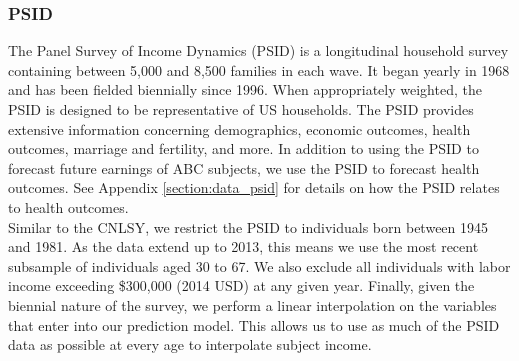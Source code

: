 \subsubsection{PSID}
\label{app:subject_income_psid}

\noindent The Panel Survey of Income Dynamics (PSID) is a longitudinal household survey containing between 5,000
and 8,500 families in each wave. It began yearly in 1968 and has been fielded biennially since 1996.
When appropriately weighted, the PSID is designed to be representative of US households. The PSID
provides extensive information concerning demographics, economic outcomes, health outcomes, marriage
and fertility, and more. In addition to using the PSID to forecast future earnings of ABC subjects, we
use the PSID to forecast health outcomes. See Appendix \ref{section:data_psid} for details on how the
PSID relates to health outcomes. \\

\noindent Similar to the CNLSY, we restrict the PSID to individuals born between 1945 and 1981. As the data
extend up to 2013, this means we use the most recent subsample of individuals aged 30 to 67.
We also exclude all individuals with labor income exceeding \$300,000 (2014 USD) at any given year.
Finally, given the biennial nature of the survey, we perform a linear interpolation on the variables
that enter into our prediction model. This allows us to use as much of the PSID data as possible at
every age to interpolate subject income. \\

